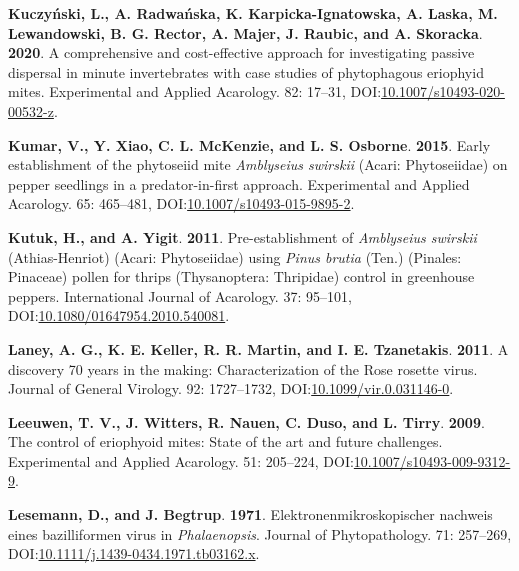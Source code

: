 \documentclass[12pt,final,CPage]{ufthesis}
\newlength{\cslhangindent}
\newenvironment{CSLReferences}[2] %
{%
	\setlength{\parindent}{0pt}
	\ifodd #1 \everypar{\setlength{\hangindent}{\cslhangindent}}\ignorespaces\fi
	\ifnum #2 > 0
	\setlength{\parskip}{#2\baselineskip}
	\fi
}%
{}
\begin{document}
{\begin{CSLReferences}{1}{0}
  \leavevmode{}%
  \textbf{Kuczyński, L., A. Radwańska, K. Karpicka-Ignatowska, A. Laska, M. Lewandowski, B. G. Rector, A. Majer, J. Raubic, and A. Skoracka}. \textbf{2020}. A comprehensive and cost-effective approach for investigating passive dispersal in minute invertebrates with case studies of phytophagous eriophyid mites. Experimental and Applied Acarology. 82: 17--31, DOI:\href{https://doi.org/10.1007/s10493-020-00532-z}{10.1007/s10493-020-00532-z}.

  \leavevmode{}%
  \textbf{Kumar, V., Y. Xiao, C. L. McKenzie, and L. S. Osborne}. \textbf{2015}. Early establishment of the phytoseiid mite {\emph{Amblyseius swirskii}} ({Acari}: {Phytoseiidae}) on pepper seedlings in a predator-in-first approach. Experimental and Applied Acarology. 65: 465--481, DOI:\href{https://doi.org/10.1007/s10493-015-9895-2}{10.1007/s10493-015-9895-2}.

  \leavevmode{}%
  \textbf{Kutuk, H., and A. Yigit}. \textbf{2011}. Pre-establishment of {\emph{Amblyseius swirskii}} {(Athias-Henriot)} {({Acari}: {Phytoseiidae})} using {\emph{Pinus brutia}} {(Ten.)} {(Pinales: Pinaceae)} pollen for thrips {(Thysanoptera: Thripidae)} control in greenhouse peppers. International Journal of Acarology. 37: 95--101, DOI:\href{https://doi.org/10.1080/01647954.2010.540081}{10.1080/01647954.2010.540081}.

  \leavevmode{}%
  \textbf{Laney, A. G., K. E. Keller, R. R. Martin, and I. E. Tzanetakis}. \textbf{2011}. A discovery 70 years in the making: Characterization of the {Rose rosette virus}. Journal of General Virology. 92: 1727--1732, DOI:\href{https://doi.org/10.1099/vir.0.031146-0}{10.1099/vir.0.031146-0}.

  \leavevmode{}%
  \textbf{Leeuwen, T. V., J. Witters, R. Nauen, C. Duso, and L. Tirry}. \textbf{2009}. The control of eriophyoid mites: State of the art and future challenges. Experimental and Applied Acarology. 51: 205--224, DOI:\href{https://doi.org/10.1007/s10493-009-9312-9}{10.1007/s10493-009-9312-9}.

  \leavevmode{}%
  \textbf{Lesemann, D., and J. Begtrup}. \textbf{1971}. Elektronenmikroskopischer nachweis eines bazilliformen virus in {\emph{Phalaenopsis}}. Journal of Phytopathology. 71: 257--269, DOI:\href{https://doi.org/10.1111/j.1439-0434.1971.tb03162.x}{10.1111/j.1439-0434.1971.tb03162.x}.


\end{CSLReferences}}
\end{document}
